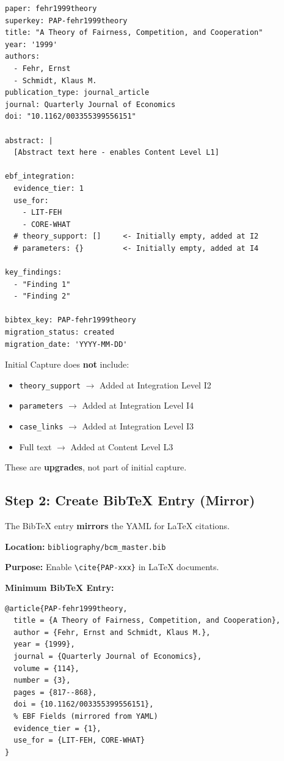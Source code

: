 \begin{verbatim}
paper: fehr1999theory
superkey: PAP-fehr1999theory
title: "A Theory of Fairness, Competition, and Cooperation"
year: '1999'
authors:
  - Fehr, Ernst
  - Schmidt, Klaus M.
publication_type: journal_article
journal: Quarterly Journal of Economics
doi: "10.1162/003355399556151"

abstract: |
  [Abstract text here - enables Content Level L1]

ebf_integration:
  evidence_tier: 1
  use_for:
    - LIT-FEH
    - CORE-WHAT
  # theory_support: []     <- Initially empty, added at I2
  # parameters: {}         <- Initially empty, added at I4

key_findings:
  - "Finding 1"
  - "Finding 2"

bibtex_key: PAP-fehr1999theory
migration_status: created
migration_date: 'YYYY-MM-DD'
\end{verbatim}

\begin{tcolorbox}[colback=yellow!5!white, colframe=yellow!75!black,
    title=Note: What Ersterfassung Does NOT Include]
Initial Capture does \textbf{not} include:
\begin{itemize}[nosep]
    \item \texttt{theory\_support} $\rightarrow$ Added at Integration Level I2
    \item \texttt{parameters} $\rightarrow$ Added at Integration Level I4
    \item \texttt{case\_links} $\rightarrow$ Added at Integration Level I3
    \item Full text $\rightarrow$ Added at Content Level L3
\end{itemize}
These are \textbf{upgrades}, not part of initial capture.
\end{tcolorbox}

\subsection{Step 2: Create BibTeX Entry (Mirror)}
\label{sec:ersterfassung-bibtex}

The BibTeX entry \textbf{mirrors} the YAML for LaTeX citations.

\textbf{Location:} \texttt{bibliography/bcm\_master.bib}

\textbf{Purpose:} Enable \texttt{\textbackslash cite\{PAP-xxx\}} in LaTeX documents.

\textbf{Minimum BibTeX Entry:}

\begin{verbatim}
@article{PAP-fehr1999theory,
  title = {A Theory of Fairness, Competition, and Cooperation},
  author = {Fehr, Ernst and Schmidt, Klaus M.},
  year = {1999},
  journal = {Quarterly Journal of Economics},
  volume = {114},
  number = {3},
  pages = {817--868},
  doi = {10.1162/003355399556151},
  % EBF Fields (mirrored from YAML)
  evidence_tier = {1},
  use_for = {LIT-FEH, CORE-WHAT}
}
\end{verbatim}

